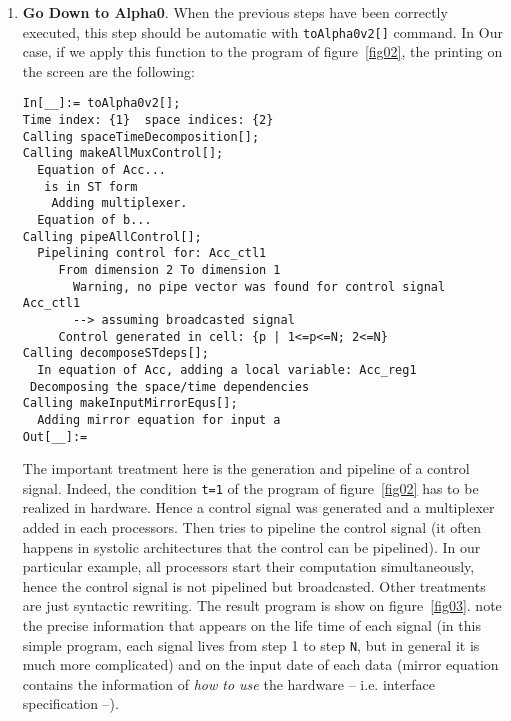 \begin{enumerate}
\item {\bf Go Down to Alpha0}. When the previous steps have been correctly 
executed, this step should be automatic with {\tt toAlpha0v2[]} command. In 
Our case, if we apply this function to the program of figure~\ref{fig02},
the printing on the screen are the following:
\begin{verbatim}
In[__]:= toAlpha0v2[];
Time index: {1}  space indices: {2}
Calling spaceTimeDecomposition[];
Calling makeAllMuxControl[];
  Equation of Acc...
   is in ST form
    Adding multiplexer.
  Equation of b...
Calling pipeAllControl[];
  Pipelining control for: Acc_ctl1
     From dimension 2 To dimension 1
       Warning, no pipe vector was found for control signal Acc_ctl1
       --> assuming broadcasted signal
     Control generated in cell: {p | 1<=p<=N; 2<=N}
Calling decomposeSTdeps[];
  In equation of Acc, adding a local variable: Acc_reg1
 Decomposing the space/time dependencies
Calling makeInputMirrorEqus[];
  Adding mirror equation for input a
Out[__]:=
\end{verbatim}

The important treatment here is the generation and pipeline of a
control signal. Indeed, the condition {\tt t=1} of the program of
figure~\ref{fig02} has to be realized in hardware.  Hence a control
signal was generated and a multiplexer added in each processors. Then
{\mmalpha} tries to pipeline the control signal (it often happens in
systolic architectures that the control can be pipelined). In our
particular example, all processors start their computation
simultaneously, hence the control signal is not pipelined but
broadcasted. Other treatments are just syntactic rewriting. The result
{\AlphaZ} program is show on figure~\ref{fig03}. note the precise information
that appears on the life time of each signal (in this simple program,
each signal lives from step 1 to step {\tt N}, but in general it is much 
more complicated) and on the input date of each data (mirror equation 
contains the information of {\em how to use} the hardware -- i.e. interface 
specification --).
\end{enumerate}
